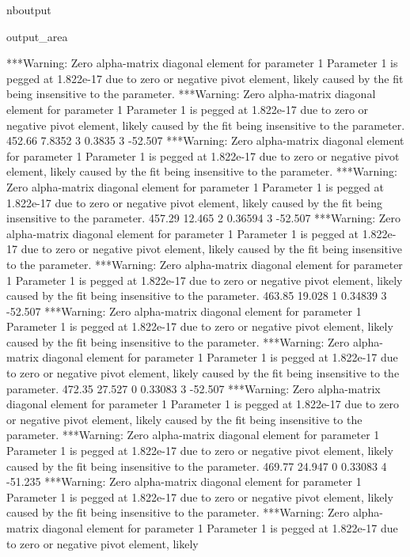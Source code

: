 \documentclass[letterpaper,10pt,english]{sphinxmanual}
\begin{document}
\begin{sphinxuseclass}{nboutput}
{\begin{sphinxuseclass}{output_area}
\begin{sphinxuseclass}{}
\begin{sphinxVerbatim}[commandchars=\\\{\}]
***Warning: Zero alpha-matrix diagonal element for parameter 1
 Parameter 1 is pegged at 1.822e-17 due to zero or negative pivot element, likely
 caused by the fit being insensitive to the parameter.
***Warning: Zero alpha-matrix diagonal element for parameter 1
 Parameter 1 is pegged at 1.822e-17 due to zero or negative pivot element, likely
 caused by the fit being insensitive to the parameter.
          452.66      7.8352    3      0.3835    3     -52.507
***Warning: Zero alpha-matrix diagonal element for parameter 1
 Parameter 1 is pegged at 1.822e-17 due to zero or negative pivot element, likely
 caused by the fit being insensitive to the parameter.
***Warning: Zero alpha-matrix diagonal element for parameter 1
 Parameter 1 is pegged at 1.822e-17 due to zero or negative pivot element, likely
 caused by the fit being insensitive to the parameter.
          457.29      12.465    2     0.36594    3     -52.507
***Warning: Zero alpha-matrix diagonal element for parameter 1
 Parameter 1 is pegged at 1.822e-17 due to zero or negative pivot element, likely
 caused by the fit being insensitive to the parameter.
***Warning: Zero alpha-matrix diagonal element for parameter 1
 Parameter 1 is pegged at 1.822e-17 due to zero or negative pivot element, likely
 caused by the fit being insensitive to the parameter.
          463.85      19.028    1     0.34839    3     -52.507
***Warning: Zero alpha-matrix diagonal element for parameter 1
 Parameter 1 is pegged at 1.822e-17 due to zero or negative pivot element, likely
 caused by the fit being insensitive to the parameter.
***Warning: Zero alpha-matrix diagonal element for parameter 1
 Parameter 1 is pegged at 1.822e-17 due to zero or negative pivot element, likely
 caused by the fit being insensitive to the parameter.
          472.35      27.527    0     0.33083    3     -52.507
***Warning: Zero alpha-matrix diagonal element for parameter 1
 Parameter 1 is pegged at 1.822e-17 due to zero or negative pivot element, likely
 caused by the fit being insensitive to the parameter.
***Warning: Zero alpha-matrix diagonal element for parameter 1
 Parameter 1 is pegged at 1.822e-17 due to zero or negative pivot element, likely
 caused by the fit being insensitive to the parameter.
          469.77      24.947    0     0.33083    4     -51.235
***Warning: Zero alpha-matrix diagonal element for parameter 1
 Parameter 1 is pegged at 1.822e-17 due to zero or negative pivot element, likely
 caused by the fit being insensitive to the parameter.
***Warning: Zero alpha-matrix diagonal element for parameter 1
 Parameter 1 is pegged at 1.822e-17 due to zero or negative pivot element, likely

\end{sphinxVerbatim}
\end{sphinxuseclass}
\end{sphinxuseclass}}
\end{sphinxuseclass}
\end{document}
